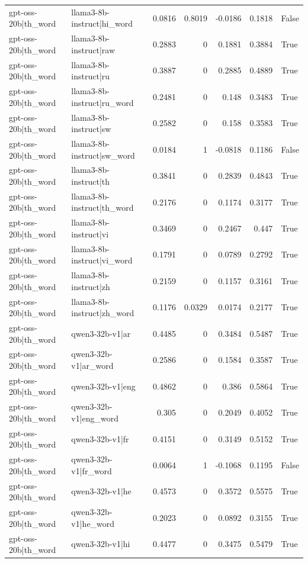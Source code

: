 \begin{table}
\begin{tabular}{l l r r r r l}
gpt-oss-20b|th_word & llama3-8b-instruct|hi_word & 0.0816 & 0.8019 & -0.0186 & 0.1818 & False \\
gpt-oss-20b|th_word & llama3-8b-instruct|raw & 0.2883 & 0 & 0.1881 & 0.3884 & True \\
gpt-oss-20b|th_word & llama3-8b-instruct|ru & 0.3887 & 0 & 0.2885 & 0.4889 & True \\
gpt-oss-20b|th_word & llama3-8b-instruct|ru_word & 0.2481 & 0 & 0.148 & 0.3483 & True \\
gpt-oss-20b|th_word & llama3-8b-instruct|sw & 0.2582 & 0 & 0.158 & 0.3583 & True \\
gpt-oss-20b|th_word & llama3-8b-instruct|sw_word & 0.0184 & 1 & -0.0818 & 0.1186 & False \\
gpt-oss-20b|th_word & llama3-8b-instruct|th & 0.3841 & 0 & 0.2839 & 0.4843 & True \\
gpt-oss-20b|th_word & llama3-8b-instruct|th_word & 0.2176 & 0 & 0.1174 & 0.3177 & True \\
gpt-oss-20b|th_word & llama3-8b-instruct|vi & 0.3469 & 0 & 0.2467 & 0.447 & True \\
gpt-oss-20b|th_word & llama3-8b-instruct|vi_word & 0.1791 & 0 & 0.0789 & 0.2792 & True \\
gpt-oss-20b|th_word & llama3-8b-instruct|zh & 0.2159 & 0 & 0.1157 & 0.3161 & True \\
gpt-oss-20b|th_word & llama3-8b-instruct|zh_word & 0.1176 & 0.0329 & 0.0174 & 0.2177 & True \\
gpt-oss-20b|th_word & qwen3-32b-v1|ar & 0.4485 & 0 & 0.3484 & 0.5487 & True \\
gpt-oss-20b|th_word & qwen3-32b-v1|ar_word & 0.2586 & 0 & 0.1584 & 0.3587 & True \\
gpt-oss-20b|th_word & qwen3-32b-v1|eng & 0.4862 & 0 & 0.386 & 0.5864 & True \\
gpt-oss-20b|th_word & qwen3-32b-v1|eng_word & 0.305 & 0 & 0.2049 & 0.4052 & True \\
gpt-oss-20b|th_word & qwen3-32b-v1|fr & 0.4151 & 0 & 0.3149 & 0.5152 & True \\
gpt-oss-20b|th_word & qwen3-32b-v1|fr_word & 0.0064 & 1 & -0.1068 & 0.1195 & False \\
gpt-oss-20b|th_word & qwen3-32b-v1|he & 0.4573 & 0 & 0.3572 & 0.5575 & True \\
gpt-oss-20b|th_word & qwen3-32b-v1|he_word & 0.2023 & 0 & 0.0892 & 0.3155 & True \\
gpt-oss-20b|th_word & qwen3-32b-v1|hi & 0.4477 & 0 & 0.3475 & 0.5479 & True \\

\end{tabular}
\end{table}
